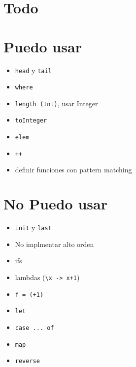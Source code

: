 \documentclass{article}
\begin{document}
\section*{Todo}
\begin{itemize}
\end{itemize}
\section*{Puedo usar}
\begin{itemize}
	\item \texttt{head} y \texttt{tail}
	\item \texttt{where}
	\item \texttt{length (Int)}, usar Integer
	\item \texttt{toInteger}
	\item \texttt{elem}
	\item \texttt{++}
	\item definir funciones con pattern matching
\end{itemize}
\section*{No Puedo usar}
\begin{itemize}
	\item \texttt{init} y \texttt{last}
	\item No implmentar alto orden
	\item ifs
	\item lambdas (\texttt{\textbackslash x -> x+1})
	\item \texttt{f = (+1)}
	\item \texttt{let}
	\item \texttt{case ... of}
	\item \texttt{map}
	\item \texttt{reverse}
\end{itemize}
\end{document}
